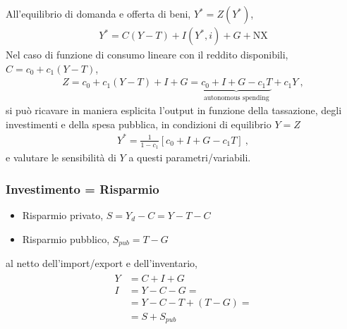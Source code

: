 \documentclass[letterpaper,10pt,italian]{jupyterBook}
\begin{document}
\sphinxAtStartPar
{} All’equilibrio di domanda e offerta di beni, \(Y^* = Z(Y^*)\),
\begin{equation*}
\begin{split}Y^* = C(Y-T) + I(Y^*,i) + G + \text{NX}\end{split}
\end{equation*}
\sphinxAtStartPar
{} Nel caso di funzione di consumo lineare con il reddito disponibili, \(C = c_0 + c_1 (Y- T)\),
\begin{equation*}
\begin{split}Z = c_0 + c_1 (Y-T) + I + G = \underbrace{c_0 + I + G - c_1 T}_{\text{autonomous spending}} + c_1 Y \ ,\end{split}
\end{equation*}
\sphinxAtStartPar
si può ricavare in maniera esplicita l’output in funzione della tassazione, degli investimenti e della spesa pubblica, in condizioni di equilibrio \(Y = Z\)
\begin{equation*}
\begin{split}Y^* = \frac{1}{1-c_1} \left[ c_0 + I + G - c_1 T \right] \ ,\end{split}
\end{equation*}
\sphinxAtStartPar
e valutare le sensibilità di \(Y\) a questi parametri/variabili.  


\subsubsection{Investimento = Risparmio}
\label{\detokenize{ch/macro:investimento-risparmio}}\label{\detokenize{ch/macro:economics-hs-macro-short-run-goods-market-i-s}}\begin{itemize}
\item {} 
\sphinxAtStartPar
Risparmio privato, \(S = Y_d - C = Y - T - C\)

\item {} 
\sphinxAtStartPar
Risparmio pubblico, \(S_{pub} = T - G\)

\end{itemize}

\sphinxAtStartPar
al netto dell’import/export e dell’inventario,
\begin{equation*}
\begin{split}\begin{aligned}
  Y & = C + I + G \\
  I & = Y - C - G = \\
    & = Y - C -  T + ( T - G ) = \\
    & = S + S_{pub}
\end{aligned}\end{split}
\end{equation*}
\end{document}
